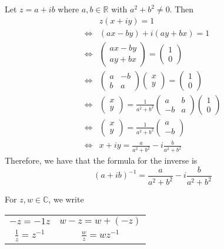 \documentclass[11pt, oneside]{book}
\begin{document}
\begin{eg}
	Let $z = a + ib$ where $a, b \in \mathbb{R}$ with $a^2 + b^2 \neq 0$. Then
	\begin{align*}
				 & z(x + iy) = 1 \\
		\iff & (ax - by) + i(ay + bx) = 1 \\
		\iff & \begin{pmatrix} ax - by \\ ay + bx	\end{pmatrix} = \begin{pmatrix} 1 \\ 0 \end{pmatrix} \\
		\iff & \begin{pmatrix} a & -b \\ b & a \end{pmatrix}\begin{pmatrix} x \\ y \end{pmatrix} = \begin{pmatrix} 1 \\ 0 \end{pmatrix} \\
		\iff & \begin{pmatrix} x \\ y \end{pmatrix} = \frac{1}{a^2 + b^2} \begin{pmatrix} a & b \\ -b & a \end{pmatrix}	\begin{pmatrix} 1 \\ 0 \end{pmatrix} \\
		\iff & \begin{pmatrix} x \\ y \end{pmatrix} = \frac{1}{a^2 + b^2}\begin{pmatrix} a \\ -b \end{pmatrix} \\
		\iff & x + iy = \frac{a}{a^2 + b^2} - i \frac{b}{a^2 + b^2} 
	\end{align*}
	Therefore, we have that the formula for the inverse is
	\begin{equation}\label{eq:complex inverse}
		(a + ib)^{-1} = \frac{a}{a^2 +b^2} - i \frac{b}{a^2 + b^2} 
	\end{equation}
\end{eg}

\begin{notation}
	For $z, w \in \mathbb{C}$, we write
	\begin{center}
		\begin{tabular}{c c}
			$-z = -1z$ & $w - z = w + (-z)$ \\
			$\frac{1}{z} = z^{-1}$ & $\frac{w}{z} = wz^{-1}$
		\end{tabular}
	\end{center}
\end{notation}
\end{document}
